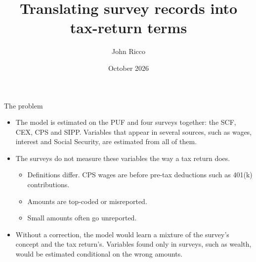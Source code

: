 


\newcommand{\slidenote}[1]{\par\vfill{\scriptsize\color{yalegrey}#1}}

\title{Translating survey records into tax-return terms}
\author{John Ricco}
\date{October 2026}




\begin{frame}
  \titlepage
\end{frame}

\begin{frame}{The problem}
  \begin{itemize}
    \item The model is estimated on the PUF and four surveys together: the SCF, CEX, CPS and SIPP.
          Variables that appear in several sources, such as wages, interest and Social Security,
          are estimated from all of them.
    \vspace{0.5em}
    \item The surveys do not measure these variables the way a tax return does.
    \begin{itemize}
      \item Definitions differ. CPS wages are before pre-tax deductions such as 401(k)
            contributions.
      \item Amounts are top-coded or misreported.
      \item Small amounts often go unreported.
    \end{itemize}
    \vspace{0.5em}
    \item Without a correction, the model would learn a mixture of the survey's concept and the tax
          return's. Variables found only in surveys, such as wealth, would be estimated conditional
          on the wrong amounts.
  \end{itemize}
\end{frame}

